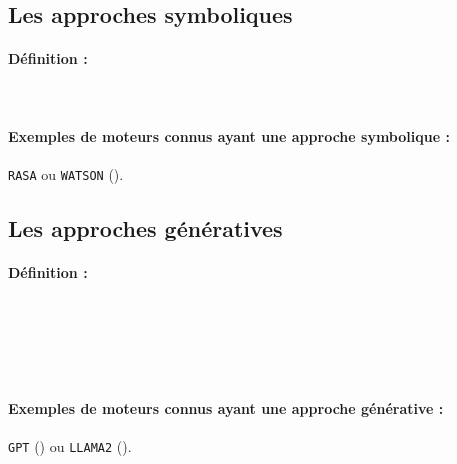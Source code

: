 		
		\subsection{Les approches symboliques}
		\label{annex:B.2.1-CHATBOT-ARCHITECTURES-SYMBOLIQUE}
		
			\paragraph{Définition :}
			
				\cite{schuurmans-frasincar:2020:intent-classification-dialogue}  \\ %
			
			\paragraph{Exemples de moteurs connus ayant une approche symbolique :}
			
				\texttt{RASA} \cite{bocklisch-etal:2017:rasa-open-source}
				ou \texttt{WATSON} (\cite{hoyt-etal:2016:ibm-watson-analytics}).
		
		
		\subsection{Les approches génératives}
		\label{annex:B.2.2-CHATBOT-ARCHITECTURES-GENERATIVE}
		
			\paragraph{Définition :}
			
				\cite{uszkoreit:2017:transformer-novel-neural}  \\ %
				\cite{ni-etal:2022:recent-advances-deep}  \\ %
				\cite{openai:2023:chatgpt}  \\ %
				\cite{touvron-etal:2023:llama-open-foundation}  \\ %
				\cite{kaddour-etal:2023:challenges-applications-large} %
			
			\paragraph{Exemples de moteurs connus ayant une approche générative :}
				\texttt{GPT} (\cite{openai:2023:chatgpt})
				ou \texttt{LLAMA2} (\cite{touvron-etal:2023:llama-open-foundation}).
	
